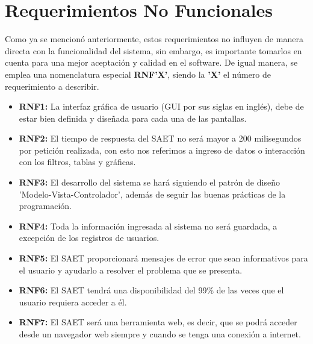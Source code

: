 \section{Requerimientos No Funcionales}
Como ya se mencionó anteriormente, estos requerimientos no influyen de manera directa con la funcionalidad del sistema, sin embargo, es importante tomarlos en cuenta para una mejor aceptación y calidad en el software. De igual manera, se emplea una nomenclatura especial \textbf{RNF'X'}, siendo la \textbf{'X'} el número de requerimiento a describir.
\begin{itemize}
	\item \textbf{RNF1:} La interfaz gráfica de usuario (GUI por sus siglas en inglés), debe de estar bien definida y diseñada para cada una de las pantallas.
	\item \textbf{RNF2:} El tiempo de respuesta del SAET no será mayor a 200 milisegundos por petición realizada, con esto nos referimos a ingreso de datos o interacción con los filtros, tablas y gráficas.
	\item \textbf{RNF3:} El desarrollo del sistema se hará siguiendo el patrón de diseño 'Modelo-Vista-Controlador', además de seguir las buenas prácticas de la programación.
	\item \textbf{RNF4:} Toda la información ingresada al sistema no será guardada, a excepción de los registros de usuarios.
	\item \textbf{RNF5:} El SAET proporcionará mensajes de error que sean informativos para el usuario y ayudarlo a resolver el problema que se presenta.
	\item \textbf{RNF6:} El SAET tendrá una disponibilidad del 99\% de las veces que el usuario requiera acceder a él.
	\item \textbf{RNF7:} El SAET será una herramienta web, es decir, que se podrá acceder desde un navegador web siempre y cuando se tenga una conexión a internet.
\end{itemize}